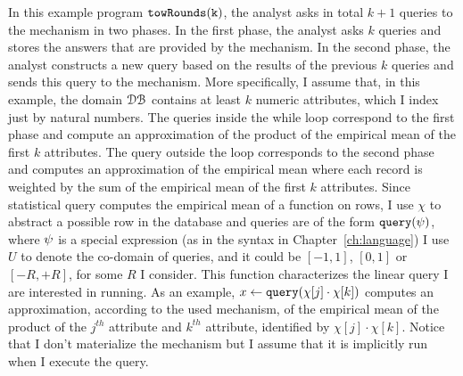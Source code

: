 \begin{example}[twoRounds]
   \label{ex:twoRounds}
    In this example program $\mathtt{towRounds(k)}$, the analyst asks in total $k+1$ queries to the mechanism in two phases.
    In the first phase, the analyst asks $k$ queries and stores the answers that are provided by the mechanism. 
    In the second phase, the analyst constructs a new query based on the results of the previous $k$ queries and sends this query to the mechanism. More specifically, I assume that, in this example, the domain $\mathcal{DB}$ 
    contains at least $k$ numeric attributes, which I index just by natural numbers. 
    The queries inside the while loop correspond to the first phase and compute an approximation of 
    the product of the empirical mean of the first $k$ attributes. 
    The query outside the loop corresponds to the second phase and computes an approximation of the empirical mean where each record is weighted by the sum of the empirical mean of the first $k$ attributes.
    {Since statistical query computes the empirical mean of a function on rows, I use $\chi$ to abstract a possible row in the database and }
    queries are of the form ${\tt query}(\psi)$, where $\psi$ is a special expression 
    (as in the syntax in Chapter~\ref{ch:language})
    {
      I use $U$ to denote the co-domain of queries, and it could be $[-1,1]$, $[0,1]$ or $[-R,+R]$, for some $R$ I consider.
      This function characterizes the linear query I are interested in running. 
      As an example, $x \leftarrow {\tt query}(\chi[j] \cdot \chi[k])$ computes an approximation, according to the used mechanism, of the empirical mean of the product of the $j^{th}$ attribute and $k^{th}$ attribute, identified by $\chi[j] \cdot \chi[k]$. Notice that I don't materialize the mechanism but I assume that it is implicitly run when I execute the query. } 


\end{example}
